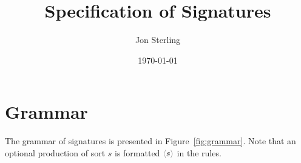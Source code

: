 \documentclass{article}
\title{Specification of \RedJonPRL{} Signatures}
\author{Jon Sterling}
\date{\today}
\begin{document}
\maketitle

\newcommand\GrayColor[1]{{\color{Gray} #1}}
\newcommand\Optional[1]{%
  {\color{Gray}\langle}%
  #1%
  {\color{Gray}\rangle}%
}

\newcommand\SortSigExpr{\mathit{sigexp}}
\newcommand\SortSigDecl{\mathit{sigdec}}
\newcommand\SortParams{\mathit{params}}
\newcommand\SortArgs{\mathit{args}}
\newcommand\SortTerm{\mathit{term}}
\newcommand\SortSymBind{\mathit{symbind}}
\newcommand\SortMetaBind{\mathit{metabind}}

\newcommand\SortValence{\mathit{valence}}
\newcommand\SortSortList{\mathit{sortlist}}

\newcommand\SortOpId{\mathit{opid}}
\newcommand\SortSortId{\mathit{sortid}}
\newcommand\SortSymId{\mathit{symid}}
\newcommand\SortMetaId{\mathit{metaid}}

\newcommand\EmptySig{\Optional{\cdot}}
\newcommand\ExtendSig[2]{#1.\ #2}

\newcommand\EmptyCtx{\Optional{\cdot}}
\newcommand\ExtendCtx[2]{#1, #2}

\newcommand\Bind[2]{#1 : #2}

\newcommand\Valence[3]{%
  \Optional{%
    \Optional{\{#1\}}%
    \Optional{[#2]}%
    .%
  }#3%
}

\newcommand\DefDecl[5]{%
  \mathtt{Def}\ #1%
  \Optional{[#2]}%
  \Optional{(#3)} %
  : #4 = [#5]
}

\newcommand\TacDecl[4]{%
  \mathtt{Tac}\ #1%
  \Optional{[#2]}%
  \Optional{(#3)} %
  = [#4]
}

\newcommand\ThmDecl[5]{%
  \mathtt{Thm}\ #1%
  \Optional{[#2]}%
  \Optional{(#3)} %
  : [#4] ~\mathtt{by}~ [#5]
}


\section{Grammar}
\label{sec:grammar}

The grammar of \RedJonPRL{} signatures is presented in
Figure~\ref{fig:grammar}. Note that an optional production of sort $s$ is
formatted $\Optional{s}$ in the rules.
\end{document}
